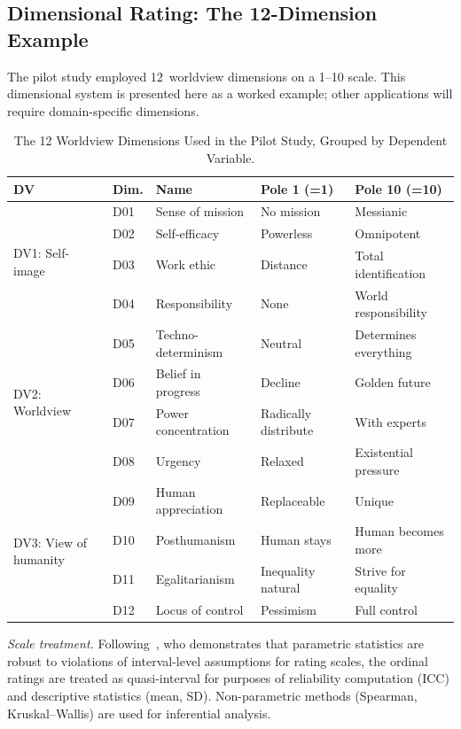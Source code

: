 \documentclass[11pt,a4paper]{article}
\begin{document}
\subsection{Dimensional Rating: The 12-Dimension Example}
\label{sec:method:dimensions}

The pilot study employed 12~worldview dimensions on a 1--10 scale. This dimensional system is presented here as a worked example; other applications will require domain-specific dimensions.

\begin{table}[htbp]
  \centering
  \caption{The 12 Worldview Dimensions Used in the Pilot Study, Grouped by Dependent Variable.}
  \label{tab:dimensions}
  \small
  \begin{tabular}{@{} l l l l l @{}}
    \toprule
    \textbf{DV} & \textbf{Dim.} & \textbf{Name} & \textbf{Pole 1 (=1)} & \textbf{Pole 10 (=10)} \\
    \midrule
    \multirow{4}{*}{DV1: Self-image}
    & D01 & Sense of mission & No mission & Messianic \\
    & D02 & Self-efficacy & Powerless & Omnipotent \\
    & D03 & Work ethic & Distance & Total identification \\
    & D04 & Responsibility & None & World responsibility \\
    \midrule
    \multirow{4}{*}{DV2: Worldview}
    & D05 & Techno-determinism & Neutral & Determines everything \\
    & D06 & Belief in progress & Decline & Golden future \\
    & D07 & Power concentration & Radically distribute & With experts \\
    & D08 & Urgency & Relaxed & Existential pressure \\
    \midrule
    \multirow{4}{*}{DV3: View of humanity}
    & D09 & Human appreciation & Replaceable & Unique \\
    & D10 & Posthumanism & Human stays & Human becomes more \\
    & D11 & Egalitarianism & Inequality natural & Strive for equality \\
    & D12 & Locus of control & Pessimism & Full control \\
    \bottomrule
  \end{tabular}
\end{table}

\emph{Scale treatment.} Following~\citet{Norman2010}, who demonstrates that parametric statistics are robust to violations of interval-level assumptions for rating scales, the ordinal ratings are treated as quasi-interval for purposes of reliability computation (ICC) and descriptive statistics (mean, SD). Non-parametric methods (Spearman, Kruskal--Wallis) are used for inferential analysis.
\end{document}
